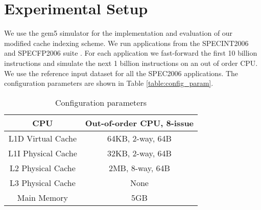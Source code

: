 \section{Experimental Setup}
We use the gem5 simulator \cite{gem5} for the implementation and evaluation of our modified cache indexing scheme. We run applications from the SPECINT2006 and SPECFP2006 suite \cite{spec2006}. For each application we fast-forward the first 10 billion instructions and simulate the next 1 billion instructions on an out of order CPU. We use the reference input dataset for all the SPEC2006 applications. The configuration parameters are shown in Table \ref{table:config_param}.

\begin{table}[h]
	\caption {Configuration parameters}
	\begin{center}
		\begin{tabular}{|c||c|}
			\hline
			CPU & Out-of-order CPU, 8-issue \\
			\hline
			L1D Virtual Cache & 64KB, 2-way, 64B \\
			\hline
			L1I Physical Cache & 32KB, 2-way, 64B \\
			\hline
			L2 Physical Cache & 2MB, 8-way, 64B \\
			\hline
			L3 Physical Cache & None \\
			\hline
			Main Memory & 5GB \\ 
			\hline
		\end{tabular}
	\end{center}
\end{table}
